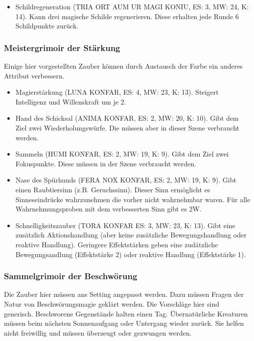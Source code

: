 \documentclass{article}
\begin{document}
\begin{itemize}
\item Schildregeneration (TRIA ORT AUM UR MAGI KONIU, ES: 3, MW: 24, K: 14). Kann drei magische Schilde regenerieren. Diese erhalten jede Runde 6 Schildpunkte zurück.
\end{itemize}

\subsubsection{Meistergrimoir der Stärkung}

Einige hier vorgestellten Zauber können durch Austausch der Farbe ein anderes Attribut verbessern.

\begin{itemize}
\item Magierstärkung (LUNA KONFAR, ES: 4, MW: 23, K: 13). Steigert Intelligenz und Willenskraft um je 2.
\item Hand des Schicksal (ANIMA KONFAR, ES: 2, MW: 20, K: 10). Gibt dem Ziel zwei Wiederholungswürfe. Die müssen aber in dieser Szene verbraucht werden.
\item Sammeln (HUMI KONFAR, ES: 2, MW: 19, K: 9). Gibt dem Ziel zwei Fokuspunkte. Diese müssen in der Szene verbraucht werden.
\item Nase des Spürhunds (FERA NOX KONFAR, ES: 2, MW: 19, K: 9). Gibt einen Raubtiersinn (z.B. Geruchssinn). Dieser Sinn ermöglicht es Sinneseindrücke wahrzunehmen die vorher nicht wahrnehmbar waren. Für alle Wahrnehmungsproben mit dem verbesserten Sinn gibt es 2W.
\item Schnelligkeitszauber (TORA KONFAR ES: 3, MW: 23, K: 13). Gibt eine zusätzlich Aktionshandlung (aber keine zusätzliche Bewegungshandlung oder reaktive Handlung). Geringere Effektstärken geben eine zudätzliche Bewegungsandlung (Effektstärke 2) oder reaktive Handlung (Effektstärke 1).
\end{itemize}

\subsubsection{Sammelgrimoir der Beschwörung}

Die Zauber hier müssen ans Setting angepasst werden. Dazu müssen Fragen der Natur von Beschwörungsmagie geklärt werden.
Die Vorschläge hier sind generisch. Beschworene Gegenstände halten einen Tag. Übernatürliche Kreaturen müssen beim
nächsten Sonnenaufgang oder Untergang wieder zurück. Sie helfen nicht freiwillig und müssen überzeugt oder gezwungen
werden.
\end{document}
